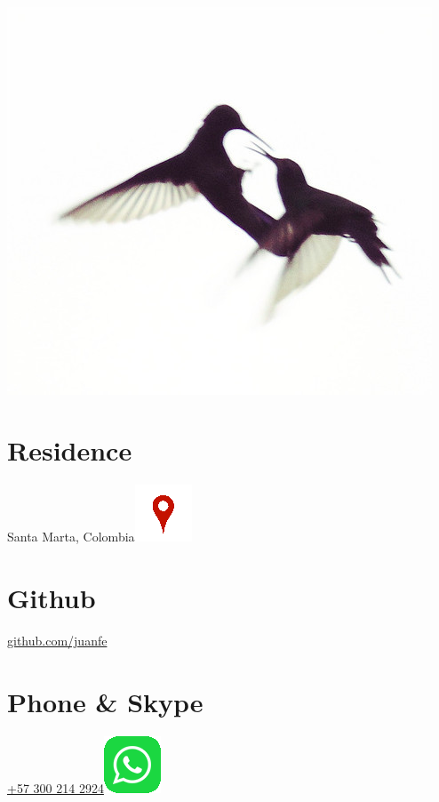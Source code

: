\begin{aside}
    ~
    ~
    ~
    ~
    ~
    ~
  \includegraphics[scale=0.8]{img/coruscan.jpg}
    ~
  \section{Residence}
    Santa Marta, Colombia\href{https://www.google.com/maps/place/Santa+Marta,+Magdalena/@11.2315666,-74.2030395,14}{\includegraphics[scale=0.15]{img/ubicacion.png}}
    ~
    ~
  \section{Github}
    \href{https://github.com/juanfe}{github.com/juanfe}
  \section{Phone \& Skype}
    \href{callto:+573002142924}{+57 300 214 2924\includegraphics[scale=0.15]{img/whatsapp.png}}
    ~
    ~

\end{aside}
